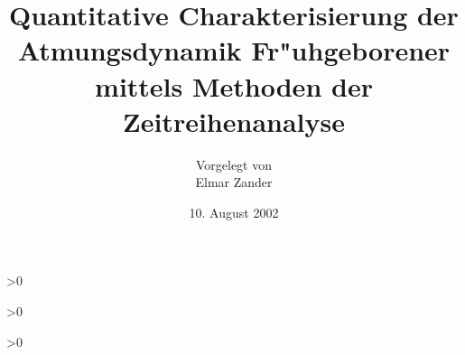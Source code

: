 \documentclass[twoside,a4paper,11pt]{scrreprt}
\def\frontmatter{}
\def\mainmatter{}
\def\backmatter{}
\def\manuscript{0}
\def\alles{1}
\def\manusscriptfile{manuscript1}
\begin{document}
\frontmatter

\titlepage
\subject{Dilpomarbeit angefertigt am Institut f"ur Theoretische Physik
I\\Wilhelm-Klemm-Str.\  9}
\title{Quantitative Charakterisierung der Atmungsdynamik Fr"uhgeborener mittels Methoden
der Zeitreihenanalyse}
\author{Vorgelegt von \\ Elmar Zander}
\date{10. August 2002}

\maketitle

\ifnum\alles>0
\tableofcontents
\fi


\ifnum\manuscript>0

\fi

\ifnum\alles>0




\mainmatter






\begin{appendix}
\end{appendix}


\comment{\nocite{*}}
\fi

\backmatter

\newpage
{}

%
%

\end{document}
